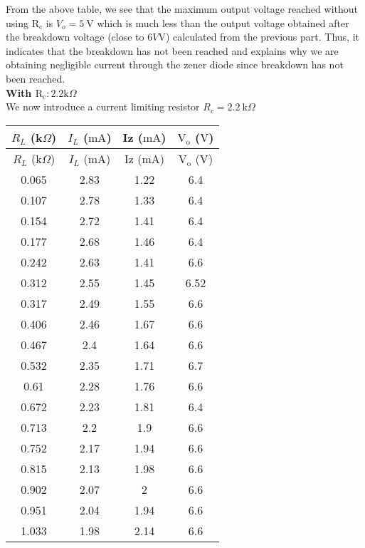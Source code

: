 \documentclass{scrartcl}
\begin{document}
\noindent
From the above table, we see that the maximum output voltage reached without using $\mathrm{R_c}$ is $V_o = 5 \ \mathrm{V}$ which is much less than the output voltage obtained after the breakdown voltage (close to $6V \mathrm{V}$) calculated from the previous part. Thus, it indicates that the breakdown has not been reached and explains why we are obtaining negligible current through the zener diode since breakdown has not been reached. \\[0.3cm]
\textbf{With $\mathrm{R_c}: 2.2 \mathrm{k}\Omega$ }\\[0.3cm]
We now introduce a current limiting resistor $R_c = 2.2 \ \mathrm{k}\Omega$

\begin{longtable}{|c|c|c|c|} 
        \hline
        $R_L$ (k$\Omega$) & {$I_L$ ($\mathrm{mA}$)} & {Iz ($\mathrm{mA}$)} & {$\mathrm{V_o}$ ($\mathrm{V}$)} \\ \hline
        \endfirsthead
        \hline 
        {$R_L$ (k$\Omega$)} & {$I_L$ ($\mathrm{mA}$)} & {Iz ($\mathrm{mA}$)} & {$\mathrm{V_o}$ ($\mathrm{V}$)} \\ \hline
        \endhead
        
        \hline
        \endfoot
        
        \hline
        \endlastfoot
        
        0.065       & 2.83      & 1.22    & 6.4     \\ \hline
        0.107       & 2.78      & 1.33    & 6.4     \\ \hline
        0.154       & 2.72      & 1.41    & 6.4     \\ \hline
        0.177       & 2.68      & 1.46    & 6.4     \\ \hline
        0.242       & 2.63      & 1.41    & 6.6     \\ \hline
        0.312       & 2.55      & 1.45    & 6.52    \\ \hline
        0.317       & 2.49      & 1.55    & 6.6     \\ \hline
        0.406       & 2.46      & 1.67    & 6.6     \\ \hline
        0.467       & 2.4       & 1.64    & 6.6     \\ \hline
        0.532       & 2.35      & 1.71    & 6.7     \\ \hline
        0.61        & 2.28      & 1.76    & 6.6     \\ \hline
        0.672       & 2.23      & 1.81    & 6.4     \\ \hline
        0.713       & 2.2       & 1.9     & 6.6     \\ \hline
        0.752       & 2.17      & 1.94    & 6.6     \\ \hline
        0.815       & 2.13      & 1.98    & 6.6     \\ \hline
        0.902       & 2.07      & 2       & 6.6     \\ \hline
        0.951       & 2.04      & 1.94    & 6.6     \\ \hline
        1.033       & 1.98      & 2.14    & 6.6     \\ \hline
        
        \end{longtable}
\end{document}
